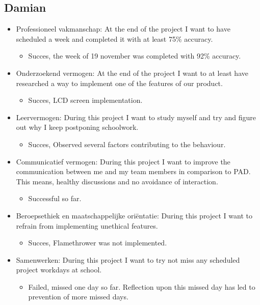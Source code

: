 \documentclass[12pt]{article}
\begin{document}
	\subsection{Damian}
	\begin{itemize}
		\item Professioneel vakmanschap: At the end of the project I want to have scheduled a week and completed it with at least 75\% accuracy.
		\begin{itemize}
			\item Succes, the week of 19 november was completed with 92\% accuracy.
		\end{itemize}
		\item Onderzoekend vermogen: At the end of the project I want to at least have researched a way to implement one of the features of our product.
		\begin{itemize}
			\item Succes, LCD screen implementation. 
		\end{itemize}
		\item Leervermogen: During this project I want to study myself and try and figure out why I keep postponing schoolwork.
		\begin{itemize}
			\item Succes, Observed several factors contributing to the behaviour. 
		\end{itemize}
		\item Communicatief vermogen: During this project I want to improve the communication between me and my team members in comparison to PAD. This means, healthy discussions and no avoidance of interaction.
		\begin{itemize}
			\item Successful so far.
		\end{itemize}
		\item Beroepsethiek en maatschappelijke oriëntatie: During this project I want to refrain from implementing unethical features.
		\begin{itemize}
			\item Succes, Flamethrower was not implemented.
		\end{itemize}
		\item Samenwerken: During this project I want to try not miss any scheduled project workdays at school.
		\begin{itemize}
			\item Failed, missed one day so far. Reflection upon this missed day has led to prevention of more missed days.
		\end{itemize}
	\end{itemize}
\end{document}
